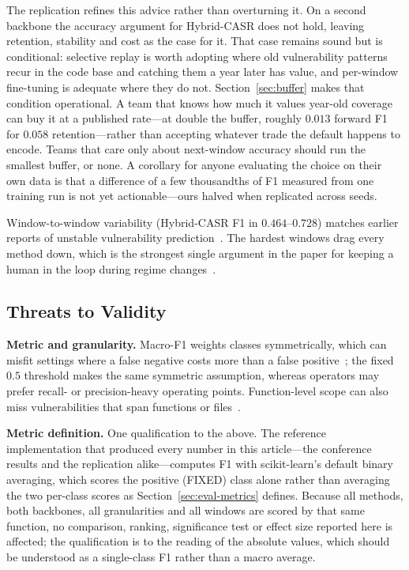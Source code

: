 \documentclass[a4paper,twoside]{article}
\begin{document}
The replication refines this advice rather than overturning it. On a second backbone the accuracy argument for Hybrid-CASR does not hold, leaving retention, stability and cost as the case for it. That case remains sound but is conditional: selective replay is worth adopting where old vulnerability patterns recur in the code base and catching them a year later has value, and per-window fine-tuning is adequate where they do not. Section~\ref{sec:buffer} makes that condition operational. A team that knows how much it values year-old coverage can buy it at a published rate---at double the buffer, roughly $0.013$ forward F1 for $0.058$ retention---rather than accepting whatever trade the default happens to encode. Teams that care only about next-window accuracy should run the smallest buffer, or none. A corollary for anyone evaluating the choice on their own data is that a difference of a few thousandths of F1 measured from one training run is not yet actionable---ours halved when replicated across seeds.

Window-to-window variability (Hybrid-CASR F1 in $0.464$--$0.728$) matches earlier reports of unstable vulnerability prediction~\citep{Jimenez2016VPM}. The hardest windows drag every method down, which is the strongest single argument in the paper for keeping a human in the loop during regime changes~\citep{Morrison2015HotSOS}.

\subsection{Threats to Validity}
\label{sec:disc-limitations}

\noindent
\textbf{Metric and granularity.} Macro-F1 weights classes symmetrically, which can misfit settings where a false negative costs more than a false positive~\citep{Davis2006PRROC,Saito2015PRBetter}; the fixed $0.5$ threshold makes the same symmetric assumption, whereas operators may prefer recall- or precision-heavy operating points. Function-level scope can also miss vulnerabilities that span functions or files~\citep{Shin2011Complexity}.

\textbf{Metric definition.} One qualification to the above. The reference implementation that produced every number in this article---the conference results and the replication alike---computes F1 with scikit-learn's default binary averaging, which scores the positive (FIXED) class alone rather than averaging the two per-class scores as Section~\ref{sec:eval-metrics} defines. Because all methods, both backbones, all granularities and all windows are scored by that same function, no comparison, ranking, significance test or effect size reported here is affected; the qualification is to the reading of the absolute values, which should be understood as a single-class F1 rather than a macro average.
\end{document}
